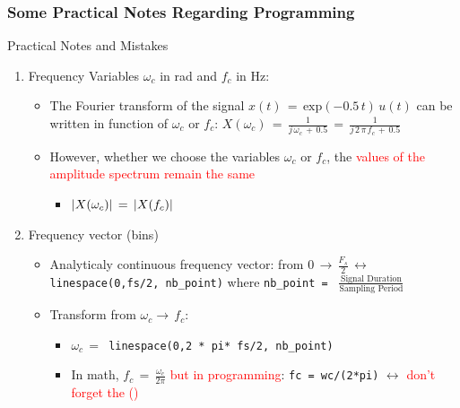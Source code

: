 \subsubsection{Some Practical Notes Regarding Programming}

\begin{frame}{Practical Notes and Mistakes}

\begin{enumerate}

\item Frequency Variables $\omega_c$ in rad and $f_c$ in Hz:

	\begin{itemize}
	\item The Fourier transform of the signal $x(t) \, = \, \text{exp}(-0.5 \, t) \, u(t)$ can be written in function of $\omega_c$ or $f_c$: $  X(\omega_c) \, = \, \displaystyle\frac{1}{j \, \omega_c\, + \, 0.5} \, = \, \displaystyle\frac{1}{j \, 2 \,\pi \,f_c\, + \, 0.5}$ 
	
	\item However, whether we choose the variables  $\omega_c$ or $f_c$, the \textcolor{red}{values of the amplitude spectrum remain the same}
	
		\begin{itemize}
		\item $\displaystyle\left\lvert X(\omega_c) \displaystyle\right\rvert \, = \, \displaystyle\left\lvert X(f_c) \displaystyle\right\rvert$
		\end{itemize}
	\end{itemize}

\newpage
\item Frequency vector (bins)

	\begin{itemize}
	\item Analyticaly continuous frequency vector: from $0 \, \rightarrow \, \displaystyle\frac{F_s}{2} \, \leftrightarrow \,$ \verb|linespace(0,fs/2, nb_point)| where \verb|nb_point = | $\displaystyle\frac{\text{Signal Duration}}{\text{Sampling Period}}$
	
	\item Transform from $\omega_c \rightarrow \, f_c$: 
	
	\begin{itemize}
	\item $\omega_c \, = \, $ \verb|linespace(0,2 * pi* fs/2, nb_point)|
	
	\item In math, $f_c \, = \, \displaystyle\frac{\omega_c}{2 \pi}$ \textcolor{red}{but in programming}: \verb|fc = wc/(2*pi)| $\leftrightarrow$ \textcolor{red}{don't forget the ()}
	

\end{itemize}
\end{itemize}
\end{enumerate}
\end{frame}
